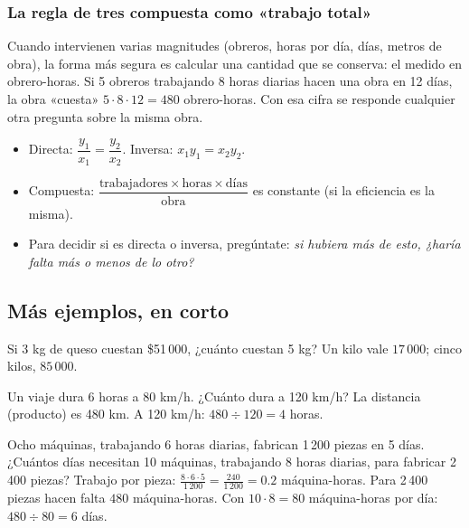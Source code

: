 
\subsubsection{La regla de tres compuesta como «trabajo total»}
Cuando intervienen varias magnitudes (obreros, horas por día, días, metros de obra), la forma más segura es calcular una
cantidad que se conserva: el  medido en obrero-horas. Si 5 obreros trabajando 8 horas diarias hacen
una obra en 12 días, la obra «cuesta» $5 \cdot 8 \cdot 12 = 480$ obrero-horas. Con esa cifra se responde cualquier otra
pregunta sobre la misma obra.

\begin{regla}
\begin{itemize}
  \item Directa: $\dfrac{y_1}{x_1} = \dfrac{y_2}{x_2}$. Inversa: $x_1 y_1 = x_2 y_2$.
  \item Compuesta: $\dfrac{\text{trabajadores} \times \text{horas} \times \text{días}}{\text{obra}}$ es constante (si
  la eficiencia es la misma).
  \item Para decidir si es directa o inversa, pregúntate: \emph{si hubiera más de esto, ¿haría falta más o menos de lo
  otro?}
\end{itemize}
\end{regla}

\subsection{Más ejemplos, en corto}
\begin{ejemplo}[Directa]
Si 3 kg de queso cuestan \$51\,000, ¿cuánto cuestan 5 kg?
\solucion Un kilo vale $17\,000$; cinco kilos, $85\,000$.
\end{ejemplo}

\begin{ejemplo}[Inversa]
Un viaje dura 6 horas a 80 km/h. ¿Cuánto dura a 120 km/h?
\solucion La distancia (producto) es 480 km. A 120 km/h: $480 \div 120 = 4$ horas.
\end{ejemplo}

\begin{ejemplo}[Compuesta]
Ocho máquinas, trabajando 6 horas diarias, fabrican 1\,200 piezas en 5 días. ¿Cuántos días necesitan 10 máquinas,
trabajando 8 horas diarias, para fabricar 2\,400 piezas?
\solucion Trabajo por pieza: $\tfrac{8 \cdot 6 \cdot 5}{1\,200} = \tfrac{240}{1\,200} = 0.2$ máquina-horas. Para 2\,400
piezas hacen falta $480$ máquina-horas. Con $10 \cdot 8 = 80$ máquina-horas por día: $480 \div 80 = 6$ días.
\end{ejemplo}

